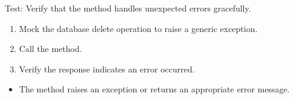 \documentclass[letterpaper,10pt,english]{sphinxmanual}
\begin{document}
\begin{fulllineitems}
\label{\detokenize{test:test.test_residetnt.test_delete_resident_unexpected_error}}
\pysigstartsignatures
\pysiglinewithargsret
{}
{\sphinxparamcomma {}}
{}
\pysigstopsignatures
\sphinxAtStartPar
Test: Verify that the method handles unexpected errors gracefully.
\begin{description}
\begin{enumerate}
%
\item {} 
\sphinxAtStartPar
Mock the database delete operation to raise a generic exception.

\item {} 
\sphinxAtStartPar
Call the  method.

\item {} 
\sphinxAtStartPar
Verify the response indicates an error occurred.

\end{enumerate}

\begin{itemize}
\item {} 
\sphinxAtStartPar
The method raises an exception or returns an appropriate error message.

\end{itemize}

\end{description}

\end{fulllineitems}

\end{document}
